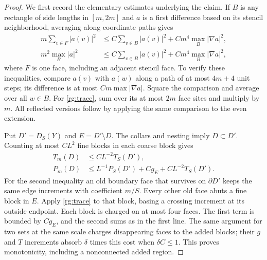 \begin{proof}
We first record the elementary estimates underlying the claim.  If $B$ is any rectangle of side lengths in $[m,2m]$ and $a$ is a first difference based on its stencil neighborhood, averaging along coordinate paths gives
\begin{align}
 m\sum_{v\in F}|a(v)|^2&\le C\sum_{v\in B}|a(v)|^2+Cm^4\max_B|\nabla a|^2,\label{rg:trace}\\
 m^2\max_B|a|^2&\le C\sum_{v\in B}|a(v)|^2+Cm^4\max_B|\nabla a|^2,\label{rg:gradient-sup}
\end{align}
where $F$ is one face, including an adjacent stencil face.  To verify these inequalities, compare $a(v)$ with $a(w)$ along a path of at most $4m+4$ unit steps; its difference is at most $Cm\max|\nabla a|$.  Square the comparison and average over all $w\in B$.  For \eqref{rg:trace}, sum over its at most $2m$ face sites and multiply by $m$.  All reflected versions follow by applying the same comparison to the even extension.

Put $D'=D_S(Y)$ and $E=D'\setminus D$.  The collars and nesting imply $D\subset D'$.  Counting at most $CL^2$ fine blocks in each coarse block gives
\begin{align}
 T_m(D)&\le CL^{-2}T_S(D'),\label{rg:det-comparison}\\
 P_m(D)&\le L^{-1}P_S(D')+Cg_E+CL^{-2}T_S(D').\nonumber
\end{align}
For the second inequality an old boundary face that survives on $\partial D'$ keeps the same edge increments with coefficient $m/S$.  Every other old face abuts a fine block in $E$.  Apply \eqref{rg:trace} to that block, basing a crossing increment at its outside endpoint.  Each block is charged on at most four faces.  The first term is bounded by $Cg_E$, and the second sums as in the first line.  The same argument for two sets at the same scale charges disappearing faces to the added blocks; their $g$ and $T$ increments absorb $\delta$ times this cost when $\delta C\le1$.  This proves monotonicity, including a nonconnected added region.


\end{proof}
